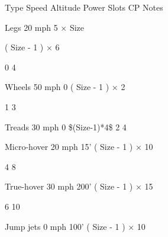 \documentclass[twoside]{book}
\begin{document}
                    
                      
                       Type 
                       Speed   
                       Altitude 
                       Power   
                       Slots 
                       CP 
                       Notes   
                      
                      
                       Legs   
                       20 mph   
                             5    ×
                            Size   
                        
                             (    Size  
                          -    1    )   
                         ×    6   
                        
                       0   
                       4   
                      
                      
                       Wheels   
                       50 mph   
                       0   
                             (    Size  
                          -    1    )   
                         ×    2   
                        
                       1   
                       3   
                      
                      
                       Treads   
                       30 mph   
                       0   
                       \$(Size-1)*4\$   
                       2   
                       4   
                      
                      
                       Micro-hover   
                       20 mph   
                       15'   
                             (    Size  
                          -    1    )   
                         ×    10   
                        
                       4   
                       8   
                      
                      
                       True-hover   
                       30 mph   
                       200'   
                             (    Size  
                          -    1    )   
                         ×    15   
                        
                       6   
                       10   
                      
                      
                       Jump jets   
                       0 mph   
                       100'   
                             (    Size  
                          -    1    )   
                         ×    10   
                        
\end{document}
